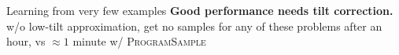 \documentclass[final]{beamer}
\newlength{\onecolwid}
\newlength{\twocolwid}
\newcommand{\theSystem}{\textsc{ProgramSample}}
\begin{document}
\begin{frame}[t]
\begin{columns}[t]
\begin{column}{\twocolwid}
\begin{columns}[t,totalwidth=\twocolwid]
\begin{column}{\onecolwid}
\begin{block}{Learning from very few examples}
\textbf{Good performance needs tilt correction.} w/o low-tilt approximation, get no samples for any of these problems after an hour, vs $\approx 1$ minute w/ \theSystem



\end{block}

  






\end{column} %

\end{columns} %



\end{column}
\end{columns}
\end{frame}
\end{document}
